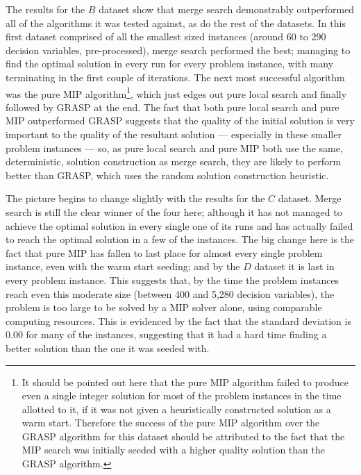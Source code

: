 \documentclass[journal]{IEEEtran}
\begin{document}
The results for the \(B\) dataset show that merge search demonstrably outperformed all of the algorithms it was tested against, as do the rest of the datasets. In this first dataset comprised of all the smallest sized instances (around 60 to 290 decision variables, pre-processed), merge search performed the best; managing to find the optimal solution in every run for every problem instance, with many terminating in the first couple of iterations. The next most successful algorithm was the pure MIP algorithm\footnote{It should be pointed out here that the pure MIP algorithm failed to produce even a single integer solution for most of the problem instances in the time allotted to it, if it was not given a heuristically constructed solution as a warm start. Therefore the success of the pure MIP algorithm over the GRASP algorithm for this dataset should be attributed to the fact that the MIP search was initially seeded with a higher quality solution than the GRASP algorithm.}, which just edges out pure local search and finally followed by GRASP at the end. The fact that both pure local search and pure MIP outperformed GRASP suggests that the quality of the initial solution is very important to the quality of the resultant solution --- especially in these smaller problem instances --- so, as pure local search and pure MIP both use the same, deterministic, solution construction as merge search, they are likely to perform better than GRASP, which uses the random solution construction heuristic.


The picture begins to change slightly with the results for the \(C\) dataset. Merge search is still the clear winner of the four here; although it has not managed to achieve the optimal solution in every single one of its runs and has actually failed to reach the optimal solution in a few of the instances. The big change here is the fact that pure MIP has fallen to last place for almost every single problem instance, even with the warm start seeding; and by the \(D\) dataset it is last in every problem instance. This suggests that, by the time the problem instances reach even this moderate size (between 400 and 5,280 decision variables), the problem is too large to be solved by a MIP solver alone, using comparable computing resources. This is evidenced by the fact that the standard deviation is 0.00 for many of the instances, suggesting that it had a hard time finding a better solution than the one it was seeded with. 
\end{document}
